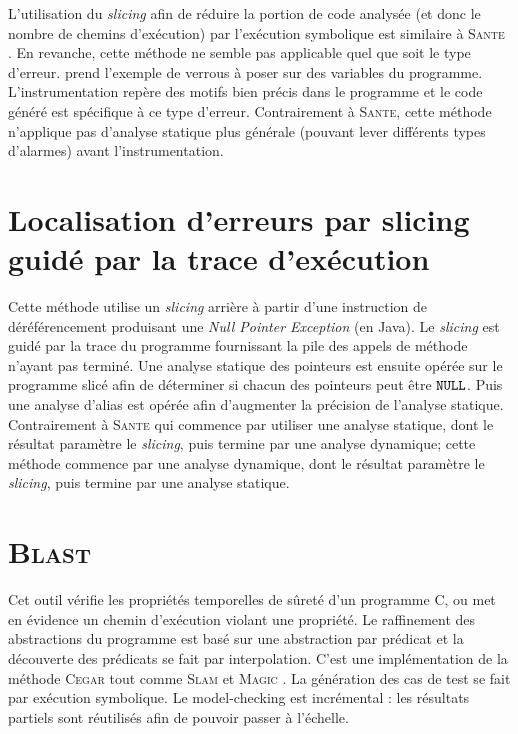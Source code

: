 L'utilisation du {\em slicing} afin de réduire la portion de code analysée
(et donc le nombre de chemins d'exécution) par l'exécution symbolique est
similaire à \textsc{Sante} \cite{SANTE}. En revanche, cette méthode ne semble
pas applicable quel que soit le type d'erreur.
\cite{checking-prop-state-machines} prend l'exemple de verrous à poser sur des
variables du programme. L'instrumentation repère des motifs bien précis dans le
programme et le code généré est spécifique à ce type d'erreur. Contrairement à
\textsc{Sante}, cette méthode n'applique pas d'analyse statique plus générale
(pouvant lever différents types d'alarmes) avant l'instrumentation.

\section{Localisation d'erreurs par slicing guidé par la trace d'exécution}

Cette méthode \cite{fault-localization} utilise un {\em slicing} arrière à
partir d'une instruction de déréférencement produisant une {\em Null Pointer
Exception} (en Java). Le {\em slicing} est guidé par la trace du programme
fournissant la pile des appels de méthode n'ayant pas terminé. Une analyse
statique des pointeurs est ensuite opérée sur le programme slicé afin de
déterminer si chacun des pointeurs peut être ${\tt NULL}$. Puis une analyse
d'alias est opérée afin d'augmenter la précision de l'analyse statique.\\

Contrairement à \textsc{Sante} \cite{SANTE} qui commence par utiliser une
analyse statique, dont le résultat paramètre le {\em slicing}, puis termine par
une analyse dynamique; cette méthode commence par une analyse dynamique, dont
le résultat paramètre le {\em slicing}, puis termine par une analyse statique.

\section{\textsc{Blast}}

Cet outil \cite{BLAST} vérifie les propriétés temporelles de sûreté d'un
programme C, ou met en évidence un chemin d'exécution violant une propriété. Le
raffinement des abstractions du programme est basé sur une abstraction par
prédicat et la découverte des prédicats se fait par interpolation. C'est une
implémentation de la méthode \textsc{Cegar} \cite{CEGAR} tout comme
\textsc{Slam} \cite{SLAM} et \textsc{Magic} \cite{MAGIC}. La génération des cas
de test se fait par exécution symbolique. Le model-checking est incrémental :
les résultats partiels sont réutilisés afin de pouvoir passer à l'échelle.\\

